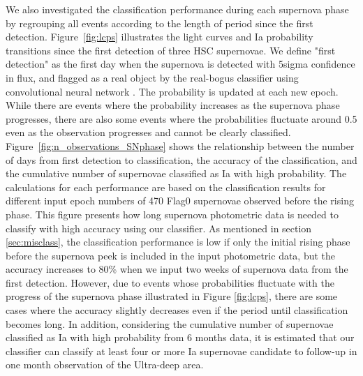 \documentclass[useamsfonts]{pasj01}
\begin{document}
We also investigated the classification performance during each supernova phase by regrouping all events according to the length of period since the first detection.
Figure\ \ref{fig:lcps} illustrates the light curves and Ia probability transitions since the first detection of three HSC supernovae.
We define "first detection" as the first day when the supernova is detected with 5sigma confidence in flux, and flagged as a real object by the real-bogus classifier using convolutional neural network \citep{yasuda19a}.
The probability is updated at each new epoch.
While there are events where the probability increases as the supernova phase progresses, there are also some events where the probabilities fluctuate around 0.5 even as the observation progresses and cannot be clearly classified.
Figure\ \ref{fig:n_observations_SNphase} shows the relationship between the number of days from first detection to classification, the accuracy of the classification, and the cumulative number of supernovae classified as Ia with high probability.
The calculations for each performance are based on the classification results for different input epoch numbers of 470 Flag0 supernovae observed before the rising phase.
This figure presents how long supernova photometric data is needed to classify with high accuracy using our classifier.
As mentioned in section \ref{sec:misclass}, the classification performance is low if only the initial rising phase before the supernova peek is included in the input photometric data, but the accuracy increases to 80\% when we input two weeks of supernova data from the first detection.
However, due to events whose probabilities fluctuate with the progress of the supernova phase illustrated in Figure \ref{fig:lcps}, there are some cases where the accuracy slightly decreases even if the period until classification becomes long.
In addition, considering the cumulative number of supernovae classified as Ia with high probability from 6 months data, it is estimated that our classifier can classify at least four or more Ia supernovae candidate to follow-up in one month observation of the Ultra-deep area.
\end{document}
